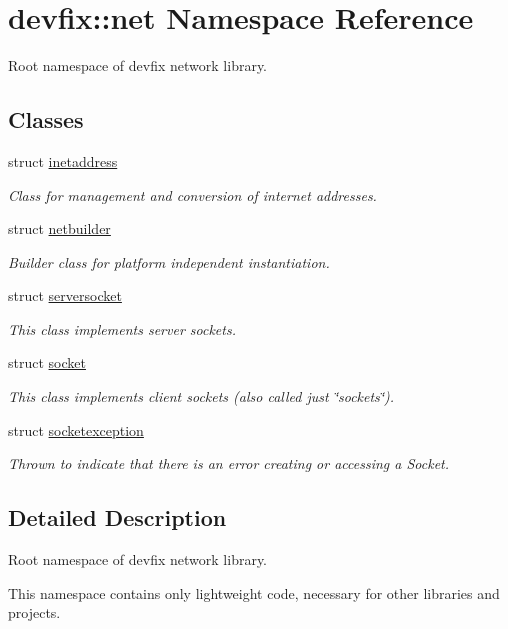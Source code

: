 \hypertarget{namespacedevfix_1_1net}{}\section{devfix\+:\+:net Namespace Reference}
\label{namespacedevfix_1_1net}


Root namespace of devfix network library.  


\subsection*{Classes}
\begin{DoxyCompactItemize}
\item 
struct \hyperlink{structdevfix_1_1net_1_1inetaddress}{inetaddress}
\begin{DoxyCompactList}\small\item\em Class for management and conversion of internet addresses. \end{DoxyCompactList}\item 
struct \hyperlink{structdevfix_1_1net_1_1netbuilder}{netbuilder}
\begin{DoxyCompactList}\small\item\em Builder class for platform independent instantiation. \end{DoxyCompactList}\item 
struct \hyperlink{structdevfix_1_1net_1_1serversocket}{serversocket}
\begin{DoxyCompactList}\small\item\em This class implements server sockets. \end{DoxyCompactList}\item 
struct \hyperlink{structdevfix_1_1net_1_1socket}{socket}
\begin{DoxyCompactList}\small\item\em This class implements client sockets (also called just \char`\"{}sockets\char`\"{}). \end{DoxyCompactList}\item 
struct \hyperlink{structdevfix_1_1net_1_1socketexception}{socketexception}
\begin{DoxyCompactList}\small\item\em Thrown to indicate that there is an error creating or accessing a Socket. \end{DoxyCompactList}\end{DoxyCompactItemize}


\subsection{Detailed Description}
Root namespace of devfix network library. 

This namespace contains only lightweight code, necessary for other libraries and projects. 
